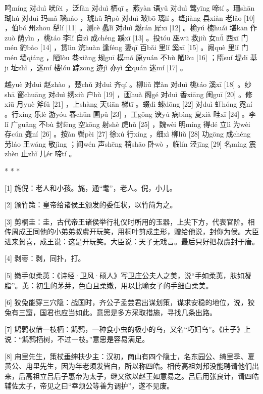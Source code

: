 \documentclass[12pt,UTF8]{ctexbook}
\begin{document}
鸣míng 对duì 吠fèi ，泛fàn 对duì 栖qī 。燕yàn 语yǔ 对duì 莺yīng 啼tí 。珊shān 瑚hú 对duì 玛mǎ 瑙nǎo ，琥hǔ 珀pò 对duì 玻bō 璃lí 。绛jiàng 县xiàn 老lǎo [10] ，伯bó 州zhōu 犁lí [11] 。测cè 蠡lǐ 对duì 燃rán 犀xī [12] 。榆yú 槐huái 堪kān 作zuò 荫yìn ，桃táo 李lǐ 自zì 成chéng 蹊xī [13] 。投tóu 巫wū 救jiù 女nǚ 西xī 门mén 豹bào [14] ，赁lìn 浣huàn 逢féng 妻qī 百bǎi 里lǐ 奚xī [15] 。阙què 里lǐ 门mén 墙qiáng ，陋lòu 巷xiàng 规guī 模mó 原yuán 不bù 陋lòu [16] ；隋suí 堤dī 基jī 址zhǐ ，迷mí 楼lóu 踪zōng 迹jì 亦yì 全quán 迷mí [17] 。

越yuè 对duì 赵zhào ，楚chǔ 对duì 齐qí 。柳liǔ 岸àn 对duì 桃táo 溪xī [18] 。纱shā 窗chuāng 对duì 绣xiù 户hù [19] ，画huà 阁gé 对duì 香xiāng 闺guī [20] 。修xiū 月yuè 斧fǔ [21] ，上shàng 天tiān 梯tī 。蝃dì 蝀dōng [22] 对duì 虹hóng 霓ní 。行xíng 乐lè 游yóu 春chūn 圃pǔ [23] ，工gōng 谀yú 病bìng 夏xià 畦xī [24] 。李lǐ 广guǎng 不bù 封fēng 空kōng 射shè 虎hǔ [25] ，魏wèi 明míng 得dé 立lì 为wèi 存cún 麑ní [26] 。按àn 辔pèi [27] 徐xú 行xíng ，细xì 柳liǔ [28] 功gōng 成chéng 劳láo 王wáng 敬jìng ；闻wén 声shēng 稍shāo 卧wò ，临lín 泾jīng [29] 名míng 震zhèn 止zhǐ 儿ér 啼tí 。



* * *



[1] 旄倪：老人和小孩。旄，通“耄”，老人。倪，小儿。

[2] 颁竹策：皇帝给诸侯王颁发的委任状，以竹简为之。

[3] 剪桐圭：圭，古代帝王诸侯举行礼仪时所用的玉器，上尖下方，代表官阶。相传周成王同他的小弟弟叔虞开玩笑，用桐叶剪成圭形，赠给他说，封你为侯。大臣进来贺喜，成王说：这是开玩笑。大臣说：天子无戏言。最后只好把叔虞封于唐。

[4] 剥枣：剥，同扑，打。

[5] 嫩手似柔荑：《诗经·卫风·硕人》写卫庄公夫人之美，说“手如柔荑，肤如凝脂”。荑：初生的茅芽，色白且柔嫩，用以比喻女子的手细白柔美。

[6] 狡兔能穿三穴隐：战国时，齐公子孟尝君出谋划策，谋求安稳的地位，说，狡兔有三窟，国君也应当如此。意思是多方采取措施，寻找几条出路。

[7] 鹪鹩权借一枝栖：鹪鹩，一种食小虫的极小的鸟，又名“巧妇鸟”。《庄子》上说：“鹪鹩栖树，不过一枝。”意思是容易满足。

[8] 甪里先生，策杖垂绅扶少主：汉初，商山有四个隐士，名东园公、绮里季、夏黄公、甪里先生，因为年老须发皆白，所以称四皓。相传高祖刘邦没能聘请他们出来，后高祖立吕后子惠帝为太子，继又欲以赵王如意易之。吕后用张良计，请四皓辅佐太子，帝见之曰“幸烦公等善为调护”，遂不见废。
\end{document}
